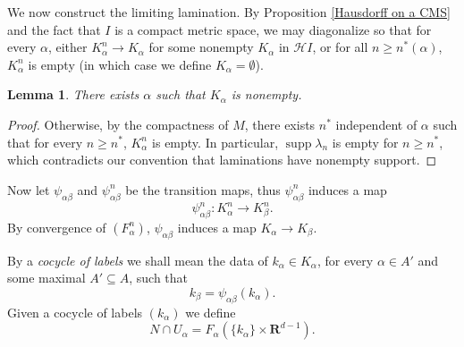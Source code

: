 \documentclass[reqno,11pt]{amsart}
\newcommand{\RR}{\mathbf{R}}
\DeclareMathOperator{\supp}{supp}
\newcommand{\Hypspace}{\mathscr H}
\newcommand{\dfn}[1]{\emph{#1}\index{#1}}
\newtheorem{lemma}[theorem]{Lemma}
\theoremstyle{definition}
\numberwithin{equation}{section}
\begin{document}
We now construct the limiting lamination.
By Proposition \ref{Hausdorff on a CMS} and the fact that $I$ is a compact metric space, we may diagonalize so that for every $\alpha$, either $K^n_\alpha \to K_\alpha$ for some nonempty $K_\alpha$ in $\Hypspace I$, or for all $n \geq n^*(\alpha)$, $K_\alpha^n$ is empty (in which case we define $K_\alpha = \emptyset$).

\begin{lemma}\label{label sets are nonempty}
	There exists $\alpha$ such that $K_\alpha$ is nonempty.
\end{lemma}
\begin{proof}
	Otherwise, by the compactness of $M$, there exists $n^*$ independent of $\alpha$ such that for every $n \geq n^*$, $K_\alpha^n$ is empty.
	In particular, $\supp \lambda_n$ is empty for $n \geq n^*$, which contradicts our convention that laminations have nonempty support.
\end{proof}

Now let $\psi_{\alpha \beta}$ and $\psi_{\alpha \beta}^n$ be the transition maps, thus $\psi_{\alpha \beta}^n$ induces a map
$$\psi_{\alpha \beta}^n: K_\alpha^n \to K_\beta^n.$$
By convergence of $(F_\alpha^n)$, $\psi_{\alpha \beta}$ induces a map $K_\alpha \to K_\beta$.

By a \dfn{cocycle of labels} we shall mean the data of $k_\alpha \in K_\alpha$, for every $\alpha \in A'$ and some maximal $A' \subseteq A$, such that 
$$k_\beta = \psi_{\alpha \beta}(k_\alpha).$$
Given a cocycle of labels $(k_\alpha)$ we define
\begin{equation}\label{cocycle implies hypersurface}
	N \cap U_\alpha = F_\alpha(\{k_\alpha\} \times \RR^{d - 1}).
\end{equation}
\end{document}
